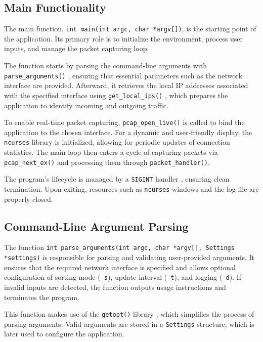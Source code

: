 \documentclass[12pt]{extarticle}
\begin{document}
\subsection{Main Functionality}

The main function, \texttt{int main(int argc, char *argv[])}, is the starting point of the application. Its primary role is to initialize the environment, process user inputs, and manage the packet capturing loop.

The function starts by parsing the command-line arguments with \texttt{parse\_arguments()} \cite{beej}, ensuring that essential parameters such as the network interface are provided. Afterward, it retrieves the local IP addresses associated with the specified interface using \texttt{get\_local\_ips()} \cite{linuxman}, which prepares the application to identify incoming and outgoing traffic.

To enable real-time packet capturing, \texttt{pcap\_open\_live()} \cite{libpcap} is called to bind the application to the chosen interface. For a dynamic and user-friendly display, the \texttt{ncurses} library \cite{ncurses} is initialized, allowing for periodic updates of connection statistics. The main loop then enters a cycle of capturing packets via \texttt{pcap\_next\_ex()} \cite{libpcap} and processing them through \texttt{packet\_handler()}.

The program's lifecycle is managed by a \texttt{SIGINT} handler \cite{linuxman}, ensuring clean termination. Upon exiting, resources such as \texttt{ncurses} windows and the log file are properly closed.

\subsection{Command-Line Argument Parsing}

The function \texttt{int parse\_arguments(int argc, char *argv[], Settings *settings)} is responsible for parsing and validating user-provided arguments. It ensures that the required network interface is specified and allows optional configuration of sorting mode (\texttt{-s}), update interval (\texttt{-t}), and logging (\texttt{-d}). If invalid inputs are detected, the function outputs usage instructions and terminates the program.

This function makes use of the \texttt{getopt()} library \cite{linuxman}, which simplifies the process of parsing arguments. Valid arguments are stored in a \texttt{Settings} structure, which is later used to configure the application.
\end{document}
